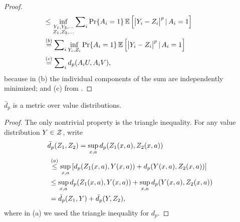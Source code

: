 \documentclass{article}
\def \dip {\bar d_p}
\begin{document}
\begin{proof}
\begin{align*}
&\hspace{-3.5em} \le \inf_{\substack{Y_1, Y_2, \dots\\Z_1, Z_2, \dots}} \sum\nolimits_i \Pr\{A_i = 1\} \expect \Big [ \big | Y_i - Z_i \big |^p \cbar A_i = 1 \Big ] \\
&\hspace{-3.5em} \overset{(b)}{=} \sum\nolimits_i \inf_{Y_i, Z_i} \Pr\{A_i = 1\} \expect \Big [ \big | Y_i - Z_i \big |^p \cbar A_i = 1 \Big ] \\
&\hspace{-3.5em} \overset{(c)}{=} \sum\nolimits_i d_p(A_i U, A_i V), 
\end{align*}
because in (b) the individual components of the sum are independently minimized; and (c) from .
\end{proof}
\begin{lem}
$\dip$ is a metric over value distributions.
\end{lem}
\begin{proof}
The only nontrivial property is the triangle inequality. For any value distribution $Y \in \mathcal{Z}$, write
\begin{align*}
\dip(Z_1, Z_2) &= \sup_{x,a} d_p(Z_1(x,a), Z_2(x,a)) \\
&\hspace{-4.25em} \overset{(a)}{\le}\sup_{x,a} \left [ d_p(Z_1(x,a), Y(x,a)) + d_p(Y(x,a), Z_2(x,a)) \right ]\\
&\hspace{-4.25em} \le \sup_{x,a} d_p(Z_1(x,a), Y(x,a)) + \sup_{x,a} d_p(Y(x,a), Z_2(x,a)) \\
&\hspace{-4.25em} = \dip(Z_1, Y) + \dip(Y, Z_2) ,
\end{align*}
where in (a) we used the triangle inequality for $d_p$.
\end{proof}
\end{document}
